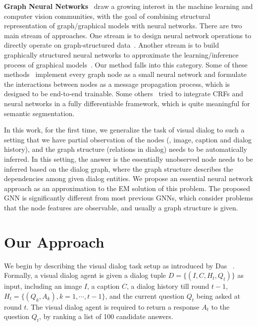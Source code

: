 \documentclass[10pt,twocolumn,letterpaper]{article}
\begin{document}
\noindent\textbf{Graph Neural Networks}~\cite{gori2005new,scarselli2009graph} draw a growing interest in the machine learning and computer vision communities, with the goal of combining structural representation of graph/graphical models with neural networks. There are two main stream of approaches. One stream is to design neural network operations to directly operate on graph-structured data~\cite{duvenaud2015convolutional,niepert2016learning,monti2016geometric,simonovsky2017dynamic,defferrard2016convolutional,kipf2017semi}. Another stream is to build graphically structured neural networks to approximate the learning/inference process of graphical models~\cite{lin2015deeply,sukhbaatar2016learning,li2016gated,fang2018learning,battaglia2016interaction,gilmer2017neural,wang2018attentive,chu2016crf}. Our method falls into this category. Some of these methods~\cite{lin2015deeply,sukhbaatar2016learning,battaglia2016interaction,gilmer2017neural,kipf2018neural,Qi_2018_ECCV} implement every graph node as a small neural network and formulate the interactions between nodes as a message propagation process, which is designed to be end-to-end trainable. Some others~\cite{zheng2015conditional,lin2015deeply,liu2015semantic,lin2016efficient,chu2016crf} tried to integrate CRFs and neural networks in a fully differentiable framework, which is quite meaningful for semantic segmentation. 

In this work, for the first time, we generalize the task of visual dialog to such a setting that we have partial observation of the nodes (\ie, image, caption and dialog history), and the graph structure (relations in dialog) needs to be automatically inferred. In this setting, the answer is the essentially unobserved node needs to be inferred based on the dialog graph, where the graph structure describes the dependencies among given dialog entities. We propose an essential neural network approach as an approximation to the EM solution of this problem. The proposed GNN is significantly different from most previous GNNs, which consider problems that the node features are observable, and usually a graph structure is given.


\vspace{-3pt}
\section{Our Approach}\label{sec:oa}
\vspace{-3pt}


We begin by describing the visual dialog task setup as introduced by Das \etal~\cite{das2017visual}. Formally, a visual dialog agent is given a dialog tuple $D\!=\!\{(I, C, H_t, Q_t)\}$ as input, including an image $I$, a caption $C$, a dialog history till round $t\!-\!1$, $H_t\!=\!\{(Q_k, A_k), k\!=\!1,\cdots,t\!-\!1\}$, and the current question $Q_t$ being asked at round $t$. The visual dialog agent is required to return a response $A_t$ to the question $Q_t$, by ranking a list of 100 candidate answers.
\end{document}
